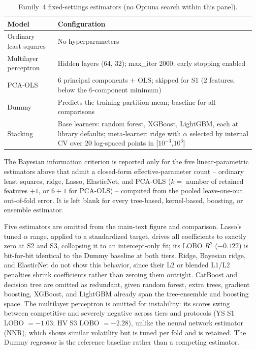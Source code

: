 \documentclass[a4paper,11pt]{article}
\begin{document}
\begin{table}[H]
\centering
\caption{Family~4 fixed-settings estimators (no Optuna search within this panel).}
\label{tab:armote_fixed}
\small
\begin{tabular}{@{}lp{7.4cm}@{}}
\toprule
Model & Configuration \\
\midrule
Ordinary least squares & No hyperparameters \\
Multilayer perceptron & Hidden layers (64, 32); max\_iter 2000; early stopping enabled \\
PCA-OLS & 6 principal components $+$ OLS; skipped for S1 (2 features, below the 6-component minimum) \\
Dummy & Predicts the training-partition mean; baseline for all comparisons \\
Stacking & Base learners: random forest, XGBoost, LightGBM, each at library defaults; meta-learner: ridge with $\alpha$ selected by internal CV over 20 log-spaced points in [$10^{-3}$,$10^{3}$] \\
\bottomrule
\end{tabular}
\end{table}

The Bayesian information criterion is reported only for the five linear-parametric estimators above that admit a closed-form effective-parameter count -- ordinary least squares, ridge, Lasso, ElasticNet, and PCA-OLS ($k=$ number of retained features $+1$, or $6+1$ for PCA-OLS) -- computed from the pooled leave-one-out out-of-fold error. It is left blank for every tree-based, kernel-based, boosting, or ensemble estimator.

Five estimators are omitted from the main-text figure and comparison. Lasso's tuned $\alpha$ range, applied to a standardized target, drives all coefficients to exactly zero at S2 and S3, collapsing it to an intercept-only fit; its LOBO $R^2$ ($-0.122$) is bit-for-bit identical to the Dummy baseline at both tiers. Ridge, Bayesian ridge, and ElasticNet do not show this behavior, since their L2 or blended L1/L2 penalties shrink coefficients rather than zeroing them outright. CatBoost and decision tree are omitted as redundant, given random forest, extra trees, gradient boosting, XGBoost, and LightGBM already span the tree-ensemble and boosting space. The multilayer perceptron is omitted for instability: its scores swing between competitive and severely negative across tiers and protocols (YS S1 LOBO $=-1.03$; HV S3 LOBO $=-2.28$), unlike the neural network estimator (NNR), which shows similar volatility but is tuned per fold and is retained. The Dummy regressor is the reference baseline rather than a competing estimator.
\end{document}
